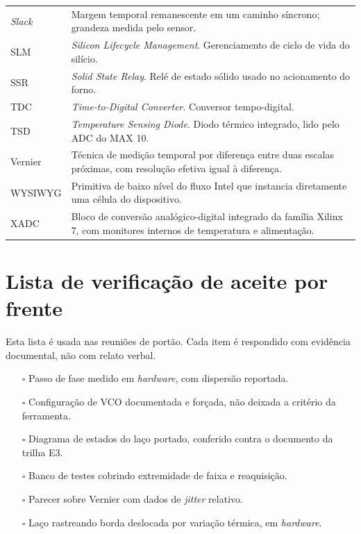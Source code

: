 \documentclass[11pt,a4paper]{article}
\newcommand{\campo}[1]{\vspace{6pt}\noindent{\bfseries\color{lescgray}#1}\par\vspace{2pt}}
\begin{document}
\begin{longtable}{@{}L{3.0cm} L{12.1cm}@{}}
\emph{Slack} & Margem temporal remanescente em um caminho síncrono; grandeza medida pelo sensor. \\
SLM & \emph{Silicon Lifecycle Management}. Gerenciamento de ciclo de vida do silício. \\
SSR & \emph{Solid State Relay}. Relé de estado sólido usado no acionamento do forno. \\
TDC & \emph{Time-to-Digital Converter}. Conversor tempo-digital. \\
TSD & \emph{Temperature Sensing Diode}. Diodo térmico integrado, lido pelo ADC do MAX 10. \\
Vernier & Técnica de medição temporal por diferença entre duas escalas próximas, com resolução efetiva igual à diferença. \\
WYSIWYG & Primitiva de baixo nível do fluxo Intel que instancia diretamente uma célula do dispositivo. \\
XADC & Bloco de conversão analógico-digital integrado da família Xilinx 7, com monitores internos de temperatura e alimentação. \\
\bottomrule
\end{longtable}

\section{Lista de verificação de aceite por frente}

Esta lista é usada nas reuniões de portão. Cada item é respondido com evidência
documental, não com relato verbal.

\campo{F1 --- Régua temporal e RTL}
\begin{itemize}
  \item[$\square$] Passo de fase medido em \emph{hardware}, com dispersão reportada.
  \item[$\square$] Configuração de VCO documentada e forçada, não deixada a critério da ferramenta.
  \item[$\square$] Diagrama de estados do laço portado, conferido contra o documento da trilha E3.
  \item[$\square$] Banco de testes cobrindo extremidade de faixa e reaquisição.
  \item[$\square$] Parecer sobre Vernier com dados de \emph{jitter} relativo.
  \item[$\square$] Laço rastreando borda deslocada por variação térmica, em \emph{hardware}.
\end{itemize}
\end{document}
